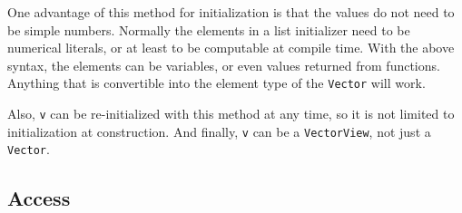 \documentclass[twoside,letterpaper,11pt]{article}
\renewcommand{\tt}[1]{{\lstinline {#1}}}
\begin{document}
One advantage of this method for initialization is that the values do not need to be simple numbers.
Normally the elements in a list initializer need to be numerical literals, or at least to be 
computable at compile time.
With the above syntax, the elements can be variables, 
or even values returned from functions.  Anything that is convertible
into the element type of the \tt{Vector} will work.

Also, \tt{v} can be re-initialized with this method at any time, so it is not limited to 
initialization at construction.  And finally, \tt{v} can be a \tt{VectorView}, not just a \tt{Vector}.


\subsection{Access}
\label{Vector_Access}
\end{document}
